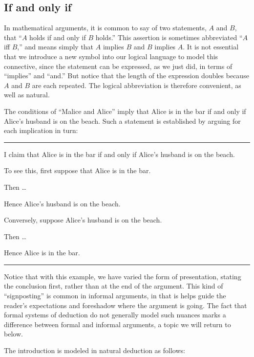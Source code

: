 \documentclass[letterpaper,10pt,english]{sphinxmanual}
\begin{document}
\subsection{If and only if}
\label{\detokenize{propositional_logic:if-and-only-if}}
\sphinxAtStartPar
In mathematical arguments, it is common to say of two statements, \(A\) and \(B\), that “\(A\) holds if and only if \(B\) holds.” This assertion is sometimes abbreviated “\(A\) iff \(B\),” and means simply that \(A\) implies \(B\) and \(B\) implies \(A\). It is not essential that we introduce a new symbol into our logical language to model this connective, since the statement can be expressed, as we just did, in terms of “implies” and “and.” But notice that the length of the expression doubles because \(A\) and \(B\) are each repeated. The logical abbreviation is therefore convenient, as well as natural.

\sphinxAtStartPar
The conditions of “Malice and Alice” imply that Alice is in the bar if and only if Alice’s husband is on the beach. Such a statement is established by arguing for each implication in turn:


\bigskip\hrule\bigskip


\sphinxAtStartPar
I claim that Alice is in the bar if and only if Alice’s husband is on the beach.

\sphinxAtStartPar
To see this, first suppose that Alice is in the bar.

\sphinxAtStartPar
Then …

\sphinxAtStartPar
Hence Alice’s husband is on the beach.

\sphinxAtStartPar
Conversely, suppose Alice’s husband is on the beach.

\sphinxAtStartPar
Then …

\sphinxAtStartPar
Hence Alice is in the bar.


\bigskip\hrule\bigskip


\sphinxAtStartPar
Notice that with this example, we have varied the form of presentation, stating the conclusion first, rather than at the end of the argument. This kind of “signposting” is common in informal arguments, in that is helps guide the reader’s expectations and foreshadow where the argument is going. The fact that formal systems of deduction do not generally model such nuances marks a difference between formal and informal arguments, a topic we will return to below.

\sphinxAtStartPar
The introduction is modeled in natural deduction as follows:
\end{document}
